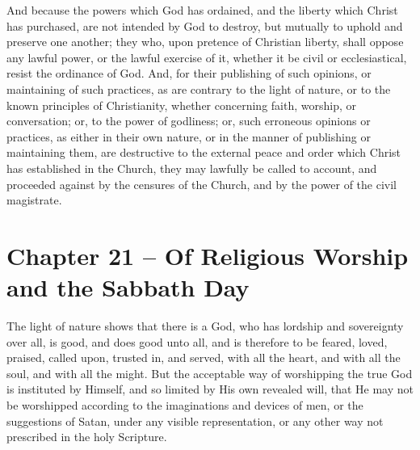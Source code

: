 \begin{outerlst}[left=0pt,labelsep=0pt]
\begin{innerlst}[resume*]
\item And because the powers which God has ordained, and the liberty which Christ has purchased, are not intended by God to destroy, but mutually to uphold and preserve one another; they who, upon pretence of Christian liberty, shall oppose any lawful power, or the lawful exercise of it, whether it be civil or ecclesiastical, resist the ordinance of God. And, for their publishing of such opinions, or maintaining of such practices, as are contrary to the light of nature, or to the known principles of Christianity, whether concerning faith, worship, or conversation; or, to the power of godliness; or, such erroneous opinions or practices, as either in their own nature, or in the manner of publishing or maintaining them, are destructive to the external peace and order which Christ has established in the Church, they may lawfully be called to account, and proceeded against by the censures of the Church, and by the power of the civil magistrate.
\end{innerlst}

\item
{}
\section{Chapter 21 -- Of Religious Worship and the Sabbath Day}
\begin{innerlst}[resume*]

\item The light of nature shows that there is a God, who has lordship and sovereignty over all, is good, and does good unto all, and is therefore to be feared, loved, praised, called upon, trusted in, and served, with all the heart, and with all the soul, and with all the might. But the acceptable way of worshipping the true God is instituted by Himself, and so limited by His own revealed will, that He may not be worshipped according to the imaginations and devices of men, or the suggestions of Satan, under any visible representation, or any other way not prescribed in the holy Scripture.   


\end{innerlst}
\end{outerlst}
